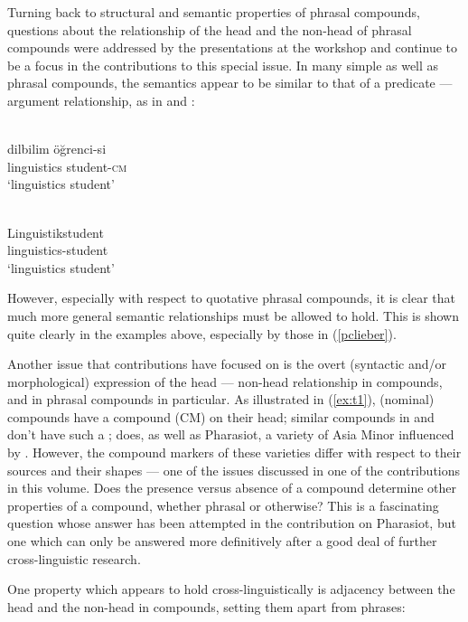 \documentclass[output=paper]{LSP/langsci}
\begin{document}
Turning back to structural and semantic properties of phrasal
compounds, questions about the relationship of the head and the
non-head of phrasal compounds were addressed by the presentations at
the workshop and continue to be a focus in the contributions to this
special issue. In many simple as well as phrasal compounds, the
semantics appear to be similar to that of a predicate — argument
relationship, as in  and :


\ea\label{ex:t1}
\\
\gll dilbilim 	ö\u{g}renci-si 	\\		
linguistics	student-\textsc{cm}		\\		
\glt `linguistics student'			\\	
\z

\ea\label{ex:t2}
\\
	\gll Linguistikstudent      \\
linguistics-student \\
\glt	`linguistics student'\\
\z

However, especially with respect to quotative phrasal compounds, it is
clear that much more general semantic relationships must be allowed to
hold. This is shown quite clearly in the examples above, especially by
those in (\ref{pclieber}).

Another issue that contributions have focused on is the overt
(syntactic and/or morphological) expression of the head — non-head
relationship in compounds, and in phrasal compounds in particular. As
illustrated in (\ref{ex:t1}),  (nominal) compounds have a compound 
(CM) on their head; similar compounds in  and  don’t have such
a ;  does, as well as Pharasiot, a variety of Asia Minor
 influenced by . However, the compound markers of these
 varieties differ with respect to their sources and their shapes
— one of the issues discussed in one of the contributions in this
volume. Does the presence versus absence of a compound 
determine other properties of a compound, whether phrasal or
otherwise? This is a fascinating question whose answer has been
attempted in the contribution on Pharasiot, but one which can only be
answered more definitively after a good deal of further
cross-linguistic research.

One property which appears to hold
cross-linguistically is adjacency between the head and the non-head in
compounds, setting them apart from phrases:\largerpage
\end{document}
